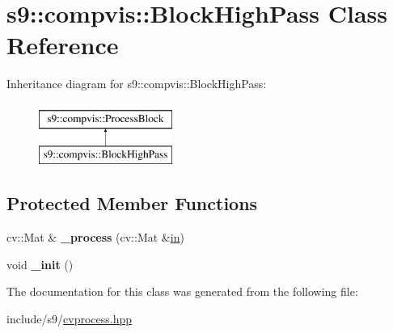\hypertarget{classs9_1_1compvis_1_1BlockHighPass}{\section{s9\-:\-:compvis\-:\-:\-Block\-High\-Pass \-Class \-Reference}
\label{classs9_1_1compvis_1_1BlockHighPass}
}
\-Inheritance diagram for s9\-:\-:compvis\-:\-:\-Block\-High\-Pass\-:\begin{figure}[H]
\begin{center}
\leavevmode
\includegraphics[height=2.000000cm]{classs9_1_1compvis_1_1BlockHighPass}
\end{center}
\end{figure}
\subsection*{\-Protected \-Member \-Functions}
\begin{DoxyCompactItemize}
\item 
\hypertarget{classs9_1_1compvis_1_1BlockHighPass_a1d1703a6b19b42712c5cb235a5d9acf1}{cv\-::\-Mat \& {\bfseries \-\_\-process} (cv\-::\-Mat \&\hyperlink{structin}{in})}\label{classs9_1_1compvis_1_1BlockHighPass_a1d1703a6b19b42712c5cb235a5d9acf1}

\item 
\hypertarget{classs9_1_1compvis_1_1BlockHighPass_a19b60ec4b79ced34b5b48c0e6b98809c}{void {\bfseries \-\_\-init} ()}\label{classs9_1_1compvis_1_1BlockHighPass_a19b60ec4b79ced34b5b48c0e6b98809c}

\end{DoxyCompactItemize}


\-The documentation for this class was generated from the following file\-:\begin{DoxyCompactItemize}
\item 
include/s9/\hyperlink{cvprocess_8hpp}{cvprocess.\-hpp}\end{DoxyCompactItemize}
